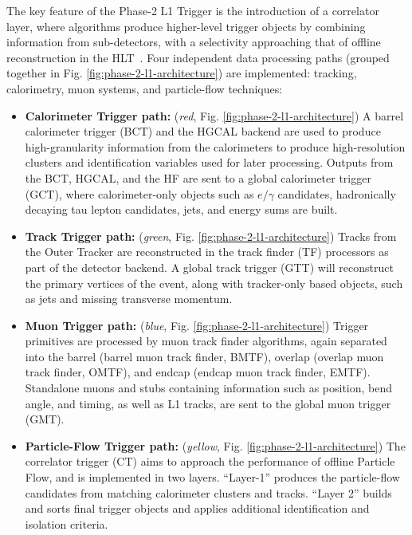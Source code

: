 The key feature of the Phase-2 L1 Trigger is the introduction of a correlator layer, where algorithms produce higher-level trigger objects by combining information from sub-detectors, with a selectivity approaching that of offline reconstruction in the HLT~\cite{CMS-TDR-021}. Four independent data processing paths (grouped together in Fig. \ref{fig:phase-2-l1-architecture}) are implemented: tracking, calorimetry, muon systems, and particle-flow techniques:
\begin{itemize}
    \item \textbf{Calorimeter Trigger path:} (\textit{red}, Fig. \ref{fig:phase-2-l1-architecture}) A barrel calorimeter trigger (BCT) and the HGCAL backend are used to produce high-granularity information from the calorimeters to produce high-resolution clusters and identification variables used for later processing. Outputs from the BCT, HGCAL, and the HF are sent to a global calorimeter trigger (GCT), where calorimeter-only objects such as $e/\gamma$ candidates, hadronically decaying tau lepton candidates, jets, and energy sums are built.
    \item \textbf{Track Trigger path:} (\textit{green}, Fig. \ref{fig:phase-2-l1-architecture}) Tracks from the Outer Tracker are reconstructed in the track finder (TF) processors as part of the detector backend. A global track trigger (GTT) will reconstruct the primary vertices of the event, along with tracker-only based objects, such as jets and missing transverse momentum.
    \item \textbf{Muon Trigger path:} (\textit{blue}, Fig. \ref{fig:phase-2-l1-architecture}) Trigger primitives are processed by muon track finder algorithms, again separated into the barrel (barrel muon track finder, BMTF), overlap (overlap muon track finder, OMTF), and endcap (endcap muon track finder, EMTF). Standalone muons and stubs containing information such as position, bend angle, and timing, as well as L1 tracks, are sent to the global muon trigger (GMT).
    \item \textbf{Particle-Flow Trigger path:} (\textit{yellow}, Fig. \ref{fig:phase-2-l1-architecture}) The correlator trigger (CT) aims to approach the performance of offline Particle Flow, and is implemented in two layers. ``Layer-1'' produces the particle-flow candidates from matching calorimeter clusters and tracks. ``Layer 2'' builds and sorts final trigger objects and applies additional identification and isolation criteria.
\end{itemize}


